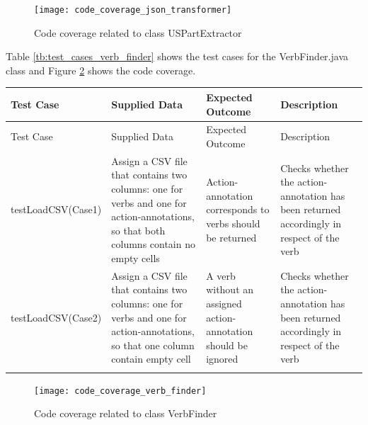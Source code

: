 \begin{figure}[h]
	\centering
	\texttt{[image: code\_coverage\_json\_transformer]}
	\caption{Code coverage related to class USPartExtractor}\label{fig:code_coverage_json_transformer}
\end{figure} 


Table \ref{tb:test_cases_verb_finder} shows the test cases for the VerbFinder.java class and Figure \ref{fig:code_coverage_verb_finder} shows the code coverage.

	\thispagestyle{empty}
		\begingroup
		\centering
		\scriptsize
		\renewcommand{\arraystretch}{1,5} 
		\keepXColumns
		\begin{tabularx}{\textwidth}{X  X  X  X}		
			\hline
			Test Case &Supplied Data&Expected Outcome&Description\\
			\hline\hline
			\endfirsthead
			\hline
			Test Case &Supplied Data&Expected Outcome&Description\\
			\hline\hline
			\endhead
			testLoadCSV\linebreak (Case1)&Assign a CSV file that contains two columns: one for verbs and one for action-annotations, so that both columns contain no empty cells&Action-annotation corresponds to verbs should be returned&Checks whether the action-annotation has been returned accordingly in respect of the verb\\
			
			testLoadCSV\linebreak (Case2)&Assign a CSV file that contains two columns: one for verbs and one for action-annotations, so that one column contain empty cell&A verb without an assigned action-annotation should be ignored&Checks whether the action-annotation has been returned accordingly in respect of the verb\\
			\hline
				\caption{Test cases for VerbFinder class}\label{tb:test_cases_verb_finder}
		\end{tabularx}		
		\endgroup

\begin{figure}[h]
	\centering
	\texttt{[image: code\_coverage\_verb\_finder]}
	\caption{Code coverage related to class VerbFinder}\label{fig:code_coverage_verb_finder}
\end{figure} 

